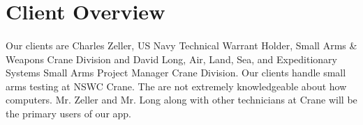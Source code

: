 \section{Client Overview}
\paragraph{} Our clients are Charles Zeller, US Navy Technical Warrant Holder, Small Arms \& Weapons Crane Division and David Long, Air, Land, Sea, and Expeditionary Systems Small Arms Project Manager Crane Division. Our clients handle small arms testing at NSWC Crane. The are not extremely knowledgeable about how computers. Mr. Zeller and Mr. Long along with other technicians at Crane will be the primary users of our app.